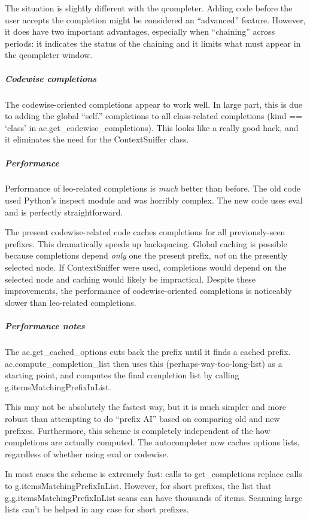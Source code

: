 \documentclass[a4paper,10pt,english]{sphinxmanual}
\begin{document}
The situation is slightly different with the qcompleter. Adding code before the
user accepts the completion might be considered an ``advanced'' feature. However,
it does have two important advantages, especially when ``chaining'' across
periods: it indicates the status of the chaining and it limits what must appear
in the qcompleter window.


\subparagraph{Codewise completions}
\label{what-is-new:codewise-completions}
The codewise-oriented completions appear to work well. In large part,
this is due to adding the global ``self.'' completions to all class-related
completions (kind == `class' in ac.get\_codewise\_completions). This looks like a
really good hack, and it eliminates the need for the ContextSniffer class.


\subparagraph{Performance}
\label{what-is-new:performance}
Performance of leo-related completions is \emph{much} better than before. The old
code used Python's inspect module and was horribly complex. The new code uses
eval and is perfectly straightforward.

The present codewise-related code caches completions for all previously-seen
prefixes. This dramatically speeds up backspacing. Global caching is possible
because completions depend \emph{only} one the present prefix, \emph{not} on the presently
selected node. If ContextSniffer were used, completions would depend on the
selected node and caching would likely be impractical. Despite these
improvements, the performance of codewise-oriented completions is noticeably
slower than leo-related completions.


\subparagraph{Performance notes}
\label{what-is-new:performance-notes}
The ac.get\_cached\_options cuts back the prefix until it finds a cached prefix.
ac.compute\_completion\_list then uses this (perhaps-way-too-long-list) as a
starting point, and computes the final completion list by calling
g.itemsMatchingPrefixInList.

This may not be absolutely the fastest way, but it is much simpler and more
robust than attempting to do ``prefix AI'' based on comparing old and new
prefixes. Furthermore, this scheme is completely independent of the how
completions are actually computed. The autocompleter now caches options lists,
regardless of whether using eval or codewise.

In most cases the scheme is extremely fast: calls to get\_completions replace
calls to g.itemsMatchingPrefixInList. However, for short prefixes, the list that
g.g.itemsMatchingPrefixInList scans can have thousands of items. Scanning large
lists can't be helped in any case for short prefixes.
\end{document}
